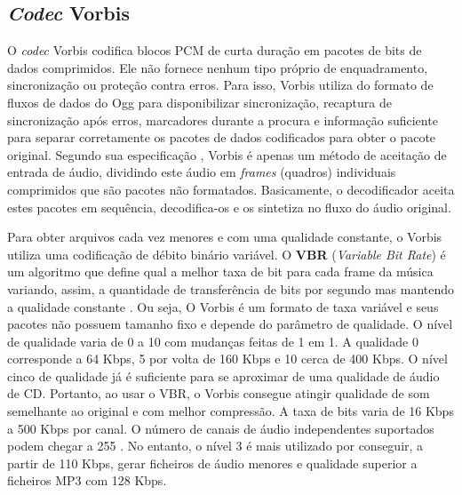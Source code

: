 \subsection{\textit{Codec} Vorbis}


O \textit{codec} Vorbis codifica blocos PCM de curta duração em pacotes de bits de dados comprimidos. Ele não fornece nenhum tipo próprio de enquadramento, sincronização ou proteção contra erros. Para isso, Vorbis utiliza do formato de fluxos de dados do Ogg para disponibilizar sincronização, recaptura de sincronização após erros, marcadores durante a procura e informação suficiente para separar corretamente os pacotes de dados codificados para obter o pacote original. Segundo sua especificação \cite{vorbis}, Vorbis é apenas um método de aceitação de entrada de áudio, dividindo este áudio em \textit{frames} (quadros) individuais comprimidos que são pacotes não formatados. Basicamente, o decodificador aceita estes pacotes em sequência, decodifica-os e os sintetiza no fluxo do áudio original.

Para obter arquivos cada vez menores e com uma qualidade constante, o Vorbis utiliza uma codificação de débito binário variável. O \textbf{VBR} (\textit{Variable Bit Rate}) é um algoritmo que define qual a melhor taxa de bit para cada frame da música variando, assim, a quantidade de transferência de bits por segundo mas mantendo a qualidade constante \cite{vbr}. Ou seja, O Vorbis é um formato de taxa variável e seus pacotes não possuem tamanho fixo e depende do parâmetro de qualidade. O nível de qualidade varia de 0 a 10 com mudanças feitas de 1 em 1. A qualidade 0 corresponde a 64 Kbps, 5 por volta de 160 Kbps e 10 cerca de 400 Kbps. O nível cinco de qualidade já é suficiente para se aproximar de uma qualidade de áudio de CD. Portanto, ao usar o VBR, o Vorbis consegue atingir qualidade de som semelhante ao original e com melhor compressão. A taxa de bits varia de 16 Kbps a 500 Kbps por canal. O número de canais de áudio independentes suportados podem chegar a 255 \cite{vorbis}. No entanto, o nível 3 é mais utilizado por conseguir, a partir de 110 Kbps, gerar ficheiros de áudio menores e qualidade superior a ficheiros MP3 com 128 Kbps.


